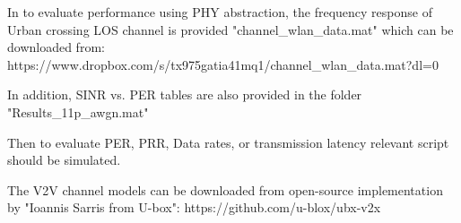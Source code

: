 In to evaluate performance using PHY abstraction, the frequency response of Urban crossing LOS channel is provided "channel_wlan_data.mat" which can be downloaded from: https://www.dropbox.com/s/tx975gatia41mq1/channel_wlan_data.mat?dl=0

In addition, SINR vs. PER tables are also provided in the folder "Results_11p_awgn.mat"

Then to evaluate PER, PRR, Data rates, or transmission latency relevant script should be simulated.

The V2V channel models can be downloaded from open-source implementation by "Ioannis Sarris from U-box": https://github.com/u-blox/ubx-v2x
